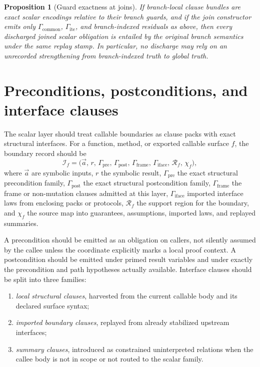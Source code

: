 \documentclass[11pt]{report}
\newtheorem{proposition}[definition]{Proposition}
\begin{document}
\begin{proposition}[Guard exactness at joins]
If branch-local clause bundles are exact scalar encodings relative to their branch guards, and if the join constructor emits only $\Gamma_{\mathrm{common}}$, $\Gamma_{\mathrm{ite}}$, and branch-indexed residuals as above, then every discharged joined scalar obligation is entailed by the original branch semantics under the same replay stamp. In particular, no discharge may rely on an unrecorded strengthening from branch-indexed truth to global truth.
\end{proposition}
\section{Preconditions, postconditions, and interface clauses}
The scalar layer should treat callable boundaries as clause packs with exact structural interfaces. For a function, method, or exported callable surface $f$, the boundary record should be
\[
\mathcal{I}_f
=
\bigl(
\vec{a},\,
r,\,
\Gamma_{\mathrm{pre}},\,
\Gamma_{\mathrm{post}},\,
\Gamma_{\mathrm{frame}},\,
\Gamma_{\mathrm{iface}},\,
\mathcal{R}_f,\,
\chi_f
\bigr),
\]
where $\vec{a}$ are symbolic inputs, $r$ the symbolic result, $\Gamma_{\mathrm{pre}}$ the exact structural precondition family, $\Gamma_{\mathrm{post}}$ the exact structural postcondition family, $\Gamma_{\mathrm{frame}}$ the frame or non-mutation clauses admitted at this layer, $\Gamma_{\mathrm{iface}}$ imported interface laws from enclosing packs or protocols, $\mathcal{R}_f$ the support region for the boundary, and $\chi_f$ the source map into guarantees, assumptions, imported laws, and replayed summaries.

A precondition should be emitted as an obligation on callers, not silently assumed by the callee unless the coordinate explicitly marks a local proof context. A postcondition should be emitted under primed result variables and under exactly the precondition and path hypotheses actually available. Interface clauses should be split into three families:
\begin{enumerate}
\item \emph{local structural clauses}, harvested from the current callable body and its declared surface syntax;
\item \emph{imported boundary clauses}, replayed from already stabilized upstream interfaces;
\item \emph{summary clauses}, introduced as constrained uninterpreted relations when the callee body is not in scope or not routed to the scalar family.
\end{enumerate}
\end{document}
